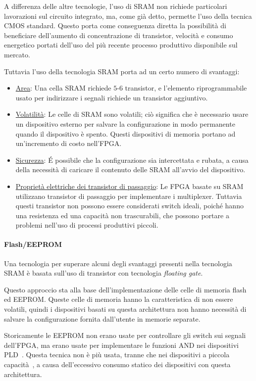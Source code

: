A differenza delle altre tecnologie, l'uso di SRAM non richiede particolari lavorazioni sul circuito integrato, ma, come già detto, permette l'uso della tecnica CMOS standard. Questo porta come conseguenza diretta la possibilità di beneficiare dell'aumento di concentrazione di transistor, velocità e consumo energetico portati dell'uso del più recente processo produttivo disponibile sul mercato.

Tuttavia l'uso della tecnologia SRAM porta ad un certo numero di svantaggi:
\begin{itemize}
	\item \underline{Area}: Una cella SRAM richiede $5$-$6$ transistor, e l'elemento riprogrammabile usato per indirizzare i segnali richiede un transistor aggiuntivo.
	\item \underline{Volatilità}: Le celle di SRAM sono volatili; ciò significa che è necessario usare un dispositivo esterno per salvare la configurazione in modo permanente quando il dispositivo è spento. Questi dispositivi di memoria portano ad un'incremento di costo nell'FPGA.
	\item \underline{Sicurezza}: \'E possibile che la configurazione sia intercettata e rubata, a causa della necessità di caricare il contenuto delle SRAM all'avvio del dispositivo.
	\item \underline{Proprietà elettriche dei transistor di passaggio}: Le FPGA basate su SRAM utilizzano transistor di passaggio per implementare i multiplexer. Tuttavia questi transistor non possono essere considerati switch ideali, poiché hanno una resistenza ed una capacità non trascurabili, che possono portare a problemi nell'uso di processi produttivi piccoli.
\end{itemize}

\paragraph{Flash/EEPROM}
Una tecnologia per superare alcuni degli svantaggi presenti nella tecnologia SRAM è basata sull'uso di transistor con tecnologia \textit{floating gate}. 

Questo approccio sta alla base dell'implementazione delle celle di memoria flash ed EEPROM. Queste celle di memoria hanno la caratteristica di non essere volatili, quindi i dispositivi basati su questa architettura non hanno necessità di salvare la configurazione fornita dall'utente in memorie separate.

Storicamente le EEPROM non erano usate per controllare gli switch sui segnali dell'FPGA, ma erano usate per implementare le funzioni AND nei dispositivi PLD~\cite{fpgabook}. Questa tecnica non è più usata, tranne che nei dispositivi a piccola capacità~\cite{cpldxilinx}, a causa dell'eccessivo consumo statico dei dispositivi con questa architettura.

